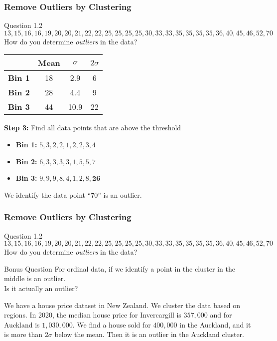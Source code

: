\documentclass[aspectratio=169, 10pt]{beamer}
\begin{document}
\begin{frame}[t]
    \frametitle{Remove Outliers by Clustering}

    \begin{block}{Question 1.2}
        \[13,15,16,16,19,20,20,21,22,22,25,25,25,25,30,33,33,35,35,35,35,36,40,45,46,52,70\]
        How do you determine \textit{outliers} in the data?
    \end{block}

    \begin{table}[]
        \begin{tabular}{l|ccc}
              & Mean & $\sigma$  & $2\sigma$ \\
              \hline
              \textbf{Bin 1} & 18   & 2.9  & 6          \\
              \textbf{Bin 2} & 28   & 4.4  & 9          \\
              \textbf{Bin 3} & 44   & 10.9 & 22        
        \end{tabular}
    \end{table}

    \textbf{Step 3:} Find all data points that are above the threshold
    \begin{itemize}
        \item \textbf{Bin 1:} $5, 3, 2, 2, 1, 2, 2, 3, 4$
        \item \textbf{Bin 2:} $6, 3, 3, 3, 3, 1, 5, 5, 7$
        \item \textbf{Bin 3:} $ 9,  9,  9,  8,  4,  1,  2,  8, \textbf{26}$
    \end{itemize}

    We identify the data point ``70'' is an outlier.
\end{frame}

\begin{frame}[t]
    \frametitle{Remove Outliers by Clustering}

    \begin{block}{Question 1.2}
        \[13,15,16,16,19,20,20,21,22,22,25,25,25,25,30,33,33,35,35,35,35,36,40,45,46,52,70\]
        How do you determine \textit{outliers} in the data?
    \end{block}

    \begin{block}{Bonus Question}
    For ordinal data, if we identify a point in the cluster in the middle is an outlier.\\
    Is it actually an outlier?
    \end{block}

    \begin{example}
        We have a house price dataset in New Zealand. We cluster the data based on regions.
        In 2020, the median house price for Invercargill is $357,000$ and for Auckland is $1,030,000$.
        We find a house sold for $400,000$ in the Auckland, and it is more than $2\sigma$ below the mean.
        Then it is an outlier in the Auckland cluster.
    \end{example}

\end{frame}
\end{document}
